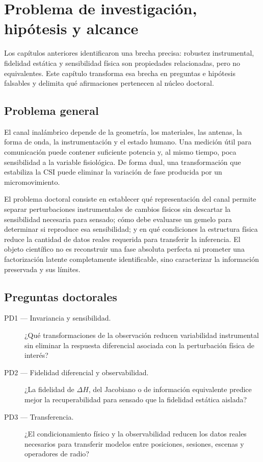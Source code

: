 \chapter{Problema de investigación, hipótesis y alcance}
\label{ch:problem}

Los capítulos anteriores identificaron una brecha precisa: robustez instrumental,
fidelidad estática y sensibilidad física son propiedades relacionadas, pero no
equivalentes. Este capítulo transforma esa brecha en preguntas e hipótesis
falsables y delimita qué afirmaciones pertenecen al núcleo doctoral.

\section{Problema general}

El canal inalámbrico depende de la geometría, los materiales, las antenas, la forma de onda, la instrumentación y el estado humano. Una medición útil para comunicación puede contener suficiente potencia y, al mismo tiempo, poca sensibilidad a la variable fisiológica. De forma dual, una transformación que estabiliza la CSI puede eliminar la variación de fase producida por un micromovimiento.

El problema doctoral consiste en establecer qué representación del canal permite separar perturbaciones instrumentales de cambios físicos sin descartar la sensibilidad necesaria para sensado; cómo debe evaluarse un gemelo para determinar si reproduce esa sensibilidad; y en qué condiciones la estructura física reduce la cantidad de datos reales requerida para transferir la inferencia. El objeto científico no es reconstruir una fase absoluta perfecta ni prometer una factorización latente completamente identificable, sino caracterizar la información preservada y sus límites.

\section{Preguntas doctorales}

\begin{description}
\item[PD1 --- Invariancia y sensibilidad.] ¿Qué transformaciones de la observación reducen variabilidad instrumental sin eliminar la respuesta diferencial asociada con la perturbación física de interés?
\item[PD2 --- Fidelidad diferencial y observabilidad.] ¿La fidelidad de $\Delta H$, del Jacobiano o de información equivalente predice mejor la recuperabilidad para sensado que la fidelidad estática aislada?
\item[PD3 --- Transferencia.] ¿El condicionamiento físico y la observabilidad reducen los datos reales necesarios para transferir modelos entre posiciones, sesiones, escenas y operadores de radio?
\end{description}

